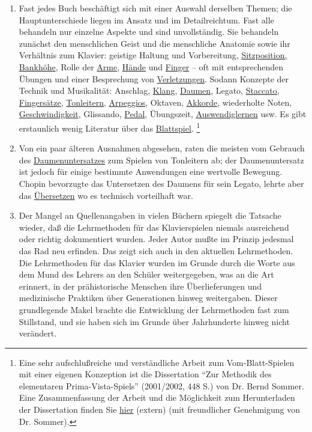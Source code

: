 \begin{enumerate}[label={\arabic*.}]
\item Fast jedes Buch beschäftigt sich mit einer Auswahl derselben Themen; die Hauptunterschiede liegen im Ansatz und im Detailreichtum.
Fast alle behandeln nur einzelne Aspekte und sind unvollständig.
Sie behandeln zunächst den menschlichen Geist und die menschliche Anatomie sowie ihr Verhältnis zum Klavier: geistige Haltung und Vorbereitung, \hyperref[c1ii3]{Sitzposition, Bankhöhe}, Rolle der \hyperref[c1ii10]{Arme}, \hyperref[c1iii4]{Hände} und \hyperref[c1iii4b]{Finger} -- oft mit entsprechenden Übungen und einer Besprechung von \hyperref[c1iii10hand]{Verletzungen}.
Sodann Konzepte der Technik und Musikalität: Anschlag, \hyperref[c1iii1]{Klang}, \hyperref[c1iii5a]{Daumen}, Legato, \hyperref[c1iii1c]{Staccato}, \hyperref[c1ii18]{Fingersätze}, \hyperref[c1iii5a]{Tonleitern}, \hyperref[Arpeggios]{Arpeggios}, Oktaven, \hyperref[c1iii7e]{Akkorde}, wiederholte Noten, \hyperref[c1ii13]{Geschwindigkeit}, Glissando, \hyperref[c1ii23]{Pedal}, Übungszeit, \hyperref[c1iii6]{Auswendiglernen} usw.
Es gibt erstaunlich wenig Literatur über das \hyperref[c1iii11]{Blattspiel}.
\label{c030530}\footnote{Eine sehr aufschlußreiche und verständliche Arbeit zum Vom-Blatt-Spielen mit einer eigenen Konzeption ist die Dissertation \enquote{Zur Methodik des elementaren Prima-Vista-Spiels} (2001/2002, 448 S.) von Dr. Bernd Sommer.
Eine Zusammenfassung der Arbeit und die Möglichkeit zum Herunterladen der Dissertation finden Sie \href{http://www.dissertation.de/buch.php3?buch=1405}{hier} (extern) (mit freundlicher Genehmigung von Dr. Sommer).}

\item Von ein paar älteren Ausnahmen abgesehen, raten die meisten vom Gebrauch des \hyperref[c1iii5a]{Daumenuntersatzes} zum Spielen von Tonleitern ab; der Daumenuntersatz ist jedoch für einige bestimmte Anwendungen eine wertvolle Bewegung.
Chopin bevorzugte das Untersetzen des Daumens für sein Legato, lehrte aber das \hyperref[c1iii5a2]{Übersetzen} wo es technisch vorteilhaft war.

\item Der Mangel an Quellenangaben in vielen Büchern spiegelt die Tatsache wieder, daß die Lehrmethoden für das Klavierspielen niemals ausreichend oder richtig dokumentiert wurden.
Jeder Autor mußte im Prinzip jedesmal das Rad neu erfinden.
Das zeigt sich auch in den aktuellen Lehrmethoden.
Die Lehrmethoden für das Klavier wurden im Grunde durch die Worte aus dem Mund des Lehrers an den Schüler weitergegeben, was an die Art erinnert, in der prähistorische Menschen ihre Überlieferungen und medizinische Praktiken über Generationen hinweg weitergaben.
Dieser grundlegende Makel brachte die Entwicklung der Lehrmethoden fast zum Stillstand, und sie haben sich im Grunde über Jahrhunderte hinweg nicht verändert.


\end{enumerate}
